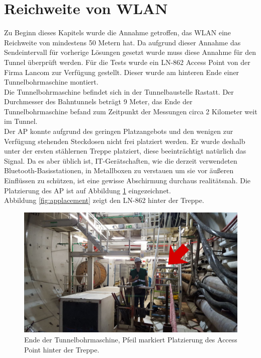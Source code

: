 \section{Reichweite von WLAN}
\label{ch:phase1:sec:rangewlan}
Zu Beginn dieses Kapitels wurde die Annahme getroffen, das WLAN eine Reichweite von mindestens 50 Metern hat.
Da aufgrund dieser Annahme das Sendeintervall für vorherige Lösungen gesetzt wurde muss diese Annahme für den Tunnel überprüft werden.
Für die Tests wurde ein LN-862 Access Point von der Firma Lancom zur Verfügung gestellt.
Dieser wurde am hinteren Ende einer Tunnelbohrmaschine montiert.\\
Die Tunnelbohrmaschine befindet sich in der Tunnelbaustelle Rastatt. 
Der Durchmesser des Bahntunnels beträgt 9 Meter, das Ende der Tunnelbohrmaschine befand zum Zeitpunkt der Messungen circa 2 Kilometer weit im Tunnel.\\
Der AP konnte aufgrund des geringen Platzangebots und den wenigen zur Verfügung stehenden Steckdosen nicht frei platziert werden.
Er wurde deshalb unter der ersten stählernen Treppe platziert, diese beeinträchtigt natürlich das Signal.
Da es aber üblich ist, IT-Gerätschaften, wie die derzeit verwendeten Bluetooth-Basisstationen, in Metallboxen zu verstauen um sie vor äußeren Einflüssen zu schützen, ist eine gewisse Abschirmung durchaus realitätsnah.
Die Platzierung des AP ist auf Abbildung \ref{fig:tunnelmark} eingezeichnet.\\
Abbildung \ref{fig:applacement} zeigt den LN-862 hinter der Treppe.

\begin{figure}[h]
  \centering
	\includegraphics[width=\textwidth]{images/tunnelmark.png}
  \caption{Ende der Tunnelbohrmaschine, Pfeil markiert Platzierung des Access Point hinter der Treppe.}
  \label{fig:tunnelmark}
\end{figure}

